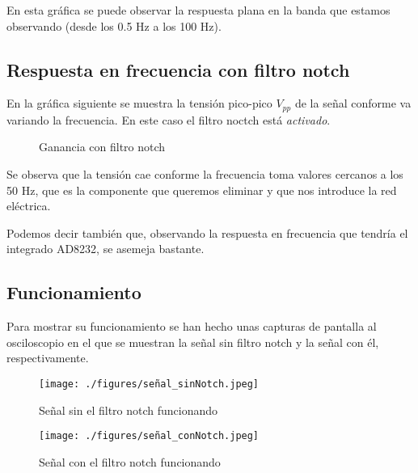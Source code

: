 \documentclass[conference]{IEEEtran}
\begin{document}
En esta gráfica se puede observar la respuesta plana en la banda que estamos observando (desde los 0.5 Hz a los 100 Hz).

\subsection{Respuesta en frecuencia con filtro notch}
En la gráfica siguiente se muestra la tensión pico-pico $V_{pp}$ de la señal conforme va variando la frecuencia. En este caso el filtro noctch está \textit{activado}.
\newline
 
\begin{figure}[htbp]
    \caption{Ganancia con filtro notch}
    \label{g_conNotch}
    \end{figure}

Se observa que la tensión cae conforme la frecuencia toma valores cercanos a los 50 Hz, que es la componente que queremos eliminar y que nos introduce la red eléctrica.

Podemos decir también que, observando la respuesta en frecuencia que tendría el integrado AD8232, se asemeja bastante.

\subsection{Funcionamiento}
Para mostrar su funcionamiento se han hecho unas capturas de pantalla al osciloscopio en el que se muestran la señal sin filtro notch y la señal con él, respectivamente.

\begin{figure}[htbp]
    \centerline{\texttt{[image: ./figures/señal\_sinNotch.jpeg]}}
    \caption{Señal sin el filtro notch funcionando}
    \label{s_sinNotch}
    \end{figure}

\begin{figure}[htbp]
    \centerline{\texttt{[image: ./figures/señal\_conNotch.jpeg]}}
    \caption{Señal con el filtro notch funcionando}
    \label{s_conNotch}
    \end{figure}
\end{document}

